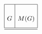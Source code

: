 \documentclass[preprint,sort&compress,12pt]{elsarticle}
\numberwithin{equation}{section}
\theoremstyle{definition}
\newcommand{\Z}{\mathbb{Z}}
\begin{document}


\[\setlength{\tabcolsep}{4pt} %
\renewcommand{\arraystretch}{3} %
{\small
\begin{tabular}{|c| c |} 
	\hline
	$G$ & $M(G)$ \\ [0.15ex] 
	\hline\hline 
    
    


\end{tabular}}\]
\end{document}
